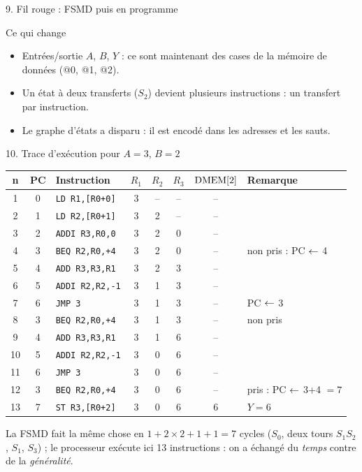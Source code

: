 \begin{frame}{9. Fil rouge : FSMD puis en programme}
\vspace{2mm}
\begin{block}{Ce qui change}
\footnotesize
\begin{itemize}\setlength{\itemsep}{1pt}
 \item Entrées/sortie $A$, $B$, $Y$ : ce sont maintenant des \alert{cases de la mémoire de données} (@0, @1, @2).
 \item Un état à deux transferts ($S_2$) devient \alert{plusieurs instructions} : un transfert par instruction.
 \item Le graphe d'états a disparu : il est \alert{encodé dans les adresses et les sauts}.
\end{itemize}
\end{block}
\end{frame}

\begin{frame}{10. Trace d'exécution pour $A=3$, $B=2$}
\centering
\scriptsize
\renewcommand{\arraystretch}{1.12}
\setlength{\tabcolsep}{5pt}
\begin{tabular}{|c|c|l|c|c|c|c|l|}
\hline
\textbf{n} & \textbf{PC} & \textbf{Instruction} & $R_1$ & $R_2$ & $R_3$ & $\mathrm{DMEM}[2]$ & \textbf{Remarque} \\ \hline
1 & 0 & \texttt{LD R1,[R0+0]} & 3 & -- & -- & -- & \\
2 & 1 & \texttt{LD R2,[R0+1]} & 3 & 2 & -- & -- & \\
3 & 2 & \texttt{ADDI R3,R0,0} & 3 & 2 & 0 & -- & \\
\rowcolor{\cT} 4 & 3 & \texttt{BEQ R2,R0,+4} & 3 & 2 & 0 & -- & non pris : PC $\leftarrow$ 4 \\
5 & 4 & \texttt{ADD R3,R3,R1} & 3 & 2 & 3 & -- & \\
6 & 5 & \texttt{ADDI R2,R2,-1} & 3 & 1 & 3 & -- & \\
7 & 6 & \texttt{JMP 3} & 3 & 1 & 3 & -- & PC $\leftarrow$ 3 \\
\rowcolor{\cT} 8 & 3 & \texttt{BEQ R2,R0,+4} & 3 & 1 & 3 & -- & non pris \\
9 & 4 & \texttt{ADD R3,R3,R1} & 3 & 1 & 6 & -- & \\
10 & 5 & \texttt{ADDI R2,R2,-1} & 3 & 0 & 6 & -- & \\
11 & 6 & \texttt{JMP 3} & 3 & 0 & 6 & -- & \\
\rowcolor{\cT} 12 & 3 & \texttt{BEQ R2,R0,+4} & 3 & 0 & 6 & -- & \alert{pris} : PC $\leftarrow$ 3+4 $=7$ \\
\rowcolor{\cV} 13 & 7 & \texttt{ST R3,[R0+2]} & 3 & 0 & 6 & \alert{6} & $Y = 6$ \\ \hline
\end{tabular}

\vspace{2mm}
\footnotesize
La FSMD fait la même chose en $1 + 2\times 2 + 1 + 1 = 7$ cycles ($S_0$, deux tours $S_1S_2$, $S_1$, $S_3$) ; le processeur exécute ici \alert{13 instructions} : on a échangé du \emph{temps} contre de la \emph{généralité}.
\end{frame}

